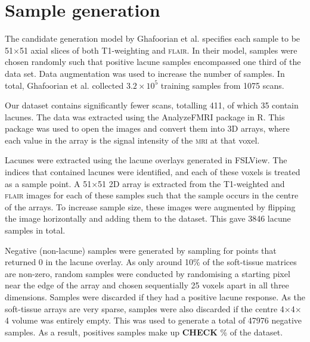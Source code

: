 
\section{Sample generation}\label{data-samples}

The candidate generation model by Ghafoorian et al. \cite{GhafoorianM.2017Dml3} specifies each sample to be 51$\times$51 axial slices of both T1-weighting and \textsc{flair}. In their model, samples were chosen randomly such that positive lacune samples encompassed one third of the data set. Data augmentation was used to increase the number of samples. In total, Ghafoorian et al. collected $3.2\times10^5$ training samples from 1075 scans.

Our dataset contains significantly fewer scans, totalling 411, of which 35 contain lacunes. The data was extracted using the AnalyzeFMRI package in R. This package was used to open the images and convert them into 3D arrays, where each value in the array is the signal intensity of the \textsc{mri} at that voxel.

Lacunes were extracted using the lacune overlays generated in FSLView. The indices that contained lacunes were identified, and each of these voxels is treated as a sample point. A 51$\times$51 2D array is extracted from the T1-weighted and \textsc{flair} images for each of these samples such that the sample occurs in the centre of the arrays. To increase sample size, these images were augmented by flipping the image horizontally and adding them to the dataset. This gave 3846 lacune samples in total.

Negative (non-lacune) samples were generated by sampling for points that returned 0 in the lacune overlay. As only around 10\% of the soft-tissue matrices are non-zero, random samples were conducted by randomising a starting pixel near the edge of the array and chosen sequentially 25 voxels apart in all three dimensions. Samples were discarded if they had a positive lacune response. As the soft-tissue arrays are very sparse, samples were also discarded if the centre 4$\times$4$\times$4 volume was entirely empty. This was used to generate a total of 47976 negative samples. As a result, positives samples make up \textbf{CHECK} \% of the dataset.

